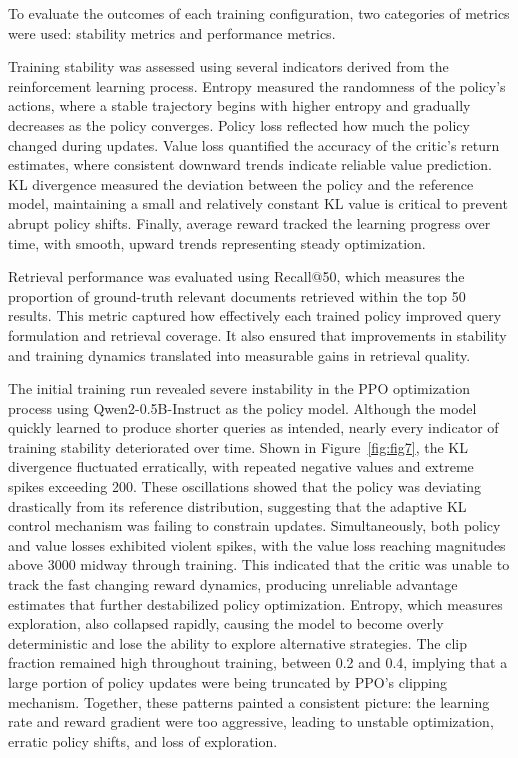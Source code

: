 To evaluate the outcomes of each training configuration, two categories of metrics were used: stability metrics and performance metrics.

Training stability was assessed using several indicators derived from the reinforcement learning process. Entropy measured the randomness of the policy’s actions, where a stable trajectory begins with higher entropy and gradually decreases as the policy converges. Policy loss reflected how much the policy changed during updates. Value loss quantified the accuracy of the critic’s return estimates, where consistent downward trends indicate reliable value prediction. KL divergence measured the deviation between the policy and the reference model, maintaining a small and relatively constant KL value is critical to prevent abrupt policy shifts. Finally, average reward tracked the learning progress over time, with smooth, upward trends representing steady optimization.

Retrieval performance was evaluated using Recall@50, which measures the proportion of ground-truth relevant documents retrieved within the top 50 results. This metric captured how effectively each trained policy improved query formulation and retrieval coverage. It also ensured that improvements in stability and training dynamics translated into measurable gains in retrieval quality.

The initial training run revealed severe instability in the PPO optimization process using Qwen2-0.5B-Instruct as the policy model. Although the model quickly learned to produce shorter queries as intended, nearly every indicator of training stability deteriorated over time. Shown in Figure~\ref{fig:fig7}, the KL divergence fluctuated erratically, with repeated negative values and extreme spikes exceeding 200. These oscillations showed that the policy was deviating drastically from its reference distribution, suggesting that the adaptive KL control mechanism was failing to constrain updates. Simultaneously, both policy and value losses exhibited violent spikes, with the value loss reaching magnitudes above 3000 midway through training. This indicated that the critic was unable to track the fast changing reward dynamics, producing unreliable advantage estimates that further destabilized policy optimization. Entropy, which measures exploration, also collapsed rapidly, causing the model to become overly deterministic and lose the ability to explore alternative strategies. The clip fraction remained high throughout training, between 0.2 and 0.4, implying that a large portion of policy updates were being truncated by PPO’s clipping mechanism. Together, these patterns painted a consistent picture: the learning rate and reward gradient were too aggressive, leading to unstable optimization, erratic policy shifts, and loss of exploration.

